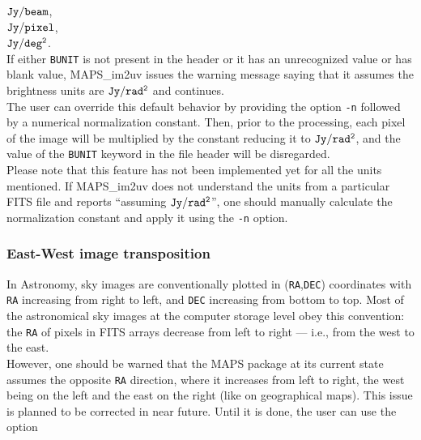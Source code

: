 \documentclass[letterpaper, twoside, 12pt]{article}
\begin{document}
${\tt Jy/beam}$,\\
${\tt Jy/pixel}$,\\
${\tt Jy/deg^2}$.\\

If either {\tt BUNIT} is not present in the header or it has an unrecognized value or has blank value, MAPS\_im2uv issues the warning message saying that it assumes the brightness units are ${\tt Jy/rad^2}$ and continues.\\

The user can override this default behavior by providing the option {\tt -n} followed by a numerical normalization constant. Then, prior to the processing, each pixel of the image will be multiplied by the constant reducing it to ${\tt Jy/rad^2}$, and the value of the {\tt BUNIT} keyword in the file header will be disregarded.\\

Please note that this feature has not been implemented yet for all the units mentioned. If MAPS\_im2uv does not understand the units from a particular FITS file and reports ``assuming ${\tt Jy/rad^2}$'', one should manually calculate the normalization constant and apply it using the {\tt -n} option.

\subsubsection*{East-West image transposition}
In Astronomy, sky images are conventionally plotted in ({\tt RA},{\tt DEC}) coordinates with {\tt RA} increasing from right to left, and {\tt DEC} increasing from bottom to top. 
Most of the astronomical sky images at the computer storage level obey this convention: the {\tt RA} of pixels in FITS arrays decrease from left to right --- i.e., from the west to the east.\\

However, one should be warned that the MAPS package at its current state 
assumes the opposite {\tt RA} direction, where it increases from left to 
right, the west being on the left and the east on the right (like on 
geographical maps). This issue is planned to be corrected in near future. 
Until it is done, the user can use the option \\
\end{document}
